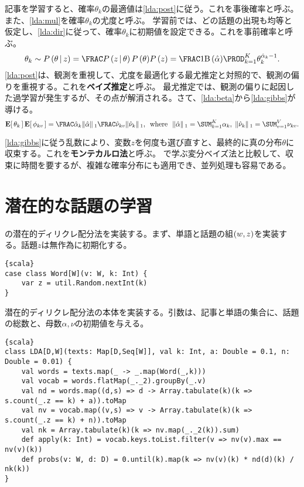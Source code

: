 \documentclass[10pt,a4paper]{book}
\begin{document}
%
記事を学習すると、確率$\theta_k$の最適値は\eqref{lda:post}に従う。これを事後確率と呼ぶ。また、\eqref{lda:mul}を確率$\theta_k$の尤度と呼ぶ。
学習前では、どの話題の出現も均等と仮定し、\eqref{lda:dir}に従って、確率$\theta_k$に初期値を設定できる。これを事前確率と呼ぶ。
%
\begin{equation}
\label{eq:lda:post}
\theta_k \sim
\Prob{\theta}[z] =
\frac{\Prob{z}[\theta] \Prob{\theta}}{\Prob{z}} =
\frac{1}{\Bd{\hat{\alpha}}} \prod_{k=1}^K \theta_k^{\hat{\alpha}_k-1}.
\end{equation}
%
\eqref{lda:post}は、観測を重視して、尤度を最適化する最尤推定と対照的で、観測の偏りを重視する。これを\textbf{ベイズ推定}と呼ぶ。
最尤推定では、観測の偏りに起因した過学習が発生するが、その点が解消される。さて、\eqref{lda:beta}から\eqref{lda:gibbs}が導ける。
%
\begin{equation}
\label{eq:lda:gibbs}
\E{\theta_k} \E{\phi_{kv}} =
\frac{\hat{\alpha}_k}{\norm{\hat{\alpha}}_1}
\frac{\hat{\nu}_{kv}}{\norm{\hat{\nu}_k}_1},
\where
\norm{\hat{\alpha}}_1 = \sum_{k=1}^K \alpha_k,\esp
\norm{\hat{\nu}_k}_1 = \sum_{v=1}^V \nu_{kv}.
\end{equation}
%
\eqref{lda:gibbs}に従う乱数により、変数$z$を何度も選び直すと、最終的に真の分布$\theta$に収束する。これを\textbf{モンテカルロ法}と呼ぶ。
で学ぶ変分ベイズ法と比較して、収束に時間を要するが、複雑な確率分布にも適用でき、並列処理も容易である。

\section{潜在的な話題の学習}

の潜在的ディリクレ配分法を実装する。まず、単語と話題の組$\pair{w}{z}$を実装する。話題$z$は無作為に初期化する。

\begin{Verbatim}{scala}
case class Word[W](v: W, k: Int) {
	var z = util.Random.nextInt(k)
}
\end{Verbatim}

潜在的ディリクレ配分法の本体を実装する。引数は、記事と単語の集合に、話題の総数と、母数$\alpha,\nu$の初期値を与える。

\begin{Verbatim}{scala}
class LDA[D,W](texts: Map[D,Seq[W]], val k: Int, a: Double = 0.1, n: Double = 0.01) {
	val words = texts.map(_ -> _.map(Word(_,k)))
	val vocab = words.flatMap(_._2).groupBy(_.v)
	val nd = words.map((d,s) => d -> Array.tabulate(k)(k => s.count(_.z == k) + a)).toMap
	val nv = vocab.map((v,s) => v -> Array.tabulate(k)(k => s.count(_.z == k) + n)).toMap
	val nk = Array.tabulate(k)(k => nv.map(_._2(k)).sum)
	def apply(k: Int) = vocab.keys.toList.filter(v => nv(v).max == nv(v)(k))
	def probs(v: W, d: D) = 0.until(k).map(k => nv(v)(k) * nd(d)(k) / nk(k))
}
\end{Verbatim}
\end{document}
